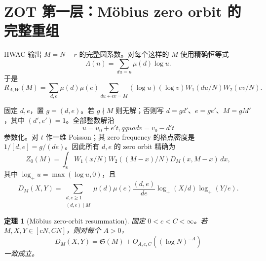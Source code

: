 \documentclass[11pt,a4paper]{ctexart}
\newtheorem{theorem}{定理}[section]
\theoremstyle{definition}
\newcommand{\1}{\mathbf 1}
\begin{document}
\section{ZOT 第一层：Möbius zero orbit 的完整重组}

HWAC 输出 $M=N-r$ 的完整圆系数。对每个这样的 $M$ 使用精确恒等式
\[
\Lambda(n)=\sum_{du=n}\mu(d)\log u.                    \tag{3.1}
\]
于是
\[
R_{\Lambda,W}(M)
=\sum_{d,e}\mu(d)\mu(e)
 \sum_{du+ev=M}(\log u)(\log v)
 W_1(du/N)W_2(ev/N).                                    \tag{3.2}
\]

固定 $d,e$，置 $g=(d,e)$。若 $g\nmid M$ 则无解；否则写
$d=gd'$、$e=ge'$、$M=gM'$，其中 $(d',e')=1$。全部整数解沿
\[
u=u_0+e't,qquad v=v_0-d't                              \tag{3.3}
\]
参数化。对 $t$ 作一维 Poisson；其 zero frequency 的格点密度是
$1/[d,e]=g/(de)$。因此所有 $d,e$ 的 zero orbit 精确为
\[
Z_0(M)=\int_{\mathbb R}W_1(x/N)W_2((M-x)/N)
D_M(x,M-x)\,dx,                                         \tag{3.4}
\]
其中 $\log_+u=\max(\log u,0)$，且
\[
D_M(X,Y)=
\sum_{\substack{d,e\ge1\\(d,e)\mid M}}
\mu(d)\mu(e)\frac{(d,e)}{de}
\log_+(X/d)\log_+(Y/e).                                \tag{3.5}
\]

\begin{theorem}[Möbius zero-orbit resummation]
固定 $0<c<C<\infty$。若 $M,X,Y\in[cN,CN]$，则对每个 $A>0$，
\[
\boxed{D_M(X,Y)=\mathfrak S(M)+O_{A,c,C}((\log N)^{-A})} \tag{3.6}
\]
一致成立。
\end{theorem}
\end{document}
